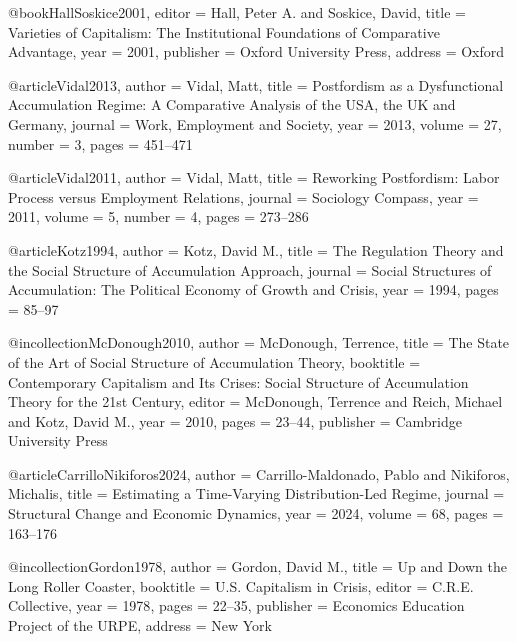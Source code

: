 @book{HallSoskice2001,
	editor    = {Hall, Peter A. and Soskice, David},
	title     = {Varieties of Capitalism: The Institutional Foundations of Comparative Advantage},
	year      = {2001},
	publisher = {Oxford University Press},
	address   = {Oxford}
}

@article{Vidal2013,
	author  = {Vidal, Matt},
	title   = {Postfordism as a Dysfunctional Accumulation Regime: A Comparative Analysis of the {USA}, the {UK} and {Germany}},
	journal = {Work, Employment and Society},
	year    = {2013},
	volume  = {27},
	number  = {3},
	pages   = {451--471}
}

@article{Vidal2011,
	author  = {Vidal, Matt},
	title   = {Reworking Postfordism: Labor Process versus Employment Relations},
	journal = {Sociology Compass},
	year    = {2011},
	volume  = {5},
	number  = {4},
	pages   = {273--286}
}

@article{Kotz1994,
	author  = {Kotz, David M.},
	title   = {The Regulation Theory and the Social Structure of Accumulation Approach},
	journal = {Social Structures of Accumulation: The Political Economy of Growth and Crisis},
	year    = {1994},
	pages   = {85--97}
}

@incollection{McDonough2010,
	author    = {McDonough, Terrence},
	title     = {The State of the Art of Social Structure of Accumulation Theory},
	booktitle = {Contemporary Capitalism and Its Crises: Social Structure of Accumulation Theory for the 21st Century},
	editor    = {McDonough, Terrence and Reich, Michael and Kotz, David M.},
	year      = {2010},
	pages     = {23--44},
	publisher = {Cambridge University Press}
}

@article{CarrilloNikiforos2024,
	author  = {Carrillo-Maldonado, Pablo and Nikiforos, Michalis},
	title   = {Estimating a Time-Varying Distribution-Led Regime},
	journal = {Structural Change and Economic Dynamics},
	year    = {2024},
	volume  = {68},
	pages   = {163--176}
}

@incollection{Gordon1978,
	author    = {Gordon, David M.},
	title     = {Up and Down the Long Roller Coaster},
	booktitle = {U.S. Capitalism in Crisis},
	editor    = {C.R.E. Collective},
	year      = {1978},
	pages     = {22--35},
	publisher = {Economics Education Project of the URPE},
	address   = {New York}
}



